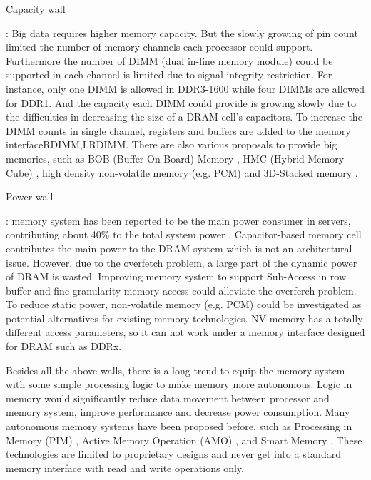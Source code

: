 \documentclass[pageno]{jpaper}
\begin{document}
\begin{bfseries}Capacity wall\end{bfseries}: Big data requires higher memory capacity. But the slowly growing of pin count limited the number of memory channels each processor could support. Furthermore the number of DIMM (dual in-line memory module) could be supported in each channel is limited due to signal integrity restriction. For instance, only one DIMM is allowed in DDR3-1600 while four DIMMs are allowed for DDR1\cite{DIMMLimit}. And the capacity each DIMM could provide is growing slowly due to the difficulties in decreasing the size of a DRAM cell's capacitors\cite{BOBMemory}. To increase the DIMM counts in single channel, registers and buffers are added to the memory interface{RDIMM,LRDIMM}.
There are also various proposals to provide big memories, such as BOB (Buffer On Board) Memory \cite{BOBMemory}, HMC (Hybrid Memory Cube) \cite{HMC}, high density non-volatile memory (e.g. PCM) \cite{PCMArch} and 3D-Stacked memory \cite{PacketMemory}.



\begin{bfseries}Power wall\end{bfseries}: memory system has been reported to be the main power consumer in servers, contributing about 40\% to the total system power \cite{MemoryPowerWall,MemScalePower}. Capacitor-based memory cell contributes the main power to the DRAM system which is not an architectural issue. However, due to the overfetch problem, a large part of the dynamic power of DRAM is wasted. Improving memory system to support Sub-Access in row buffer and fine granularity memory access could alleviate the overferch problem. To reduce static power, non-volatile memory (e.g. PCM) could be investigated as potential alternatives for existing memory technologies. NV-memory  has a totally different access parameters, so it can not work under a memory interface designed for DRAM such as DDRx.


Besides all the above walls, there is a long trend to equip the memory system with some simple processing logic to make memory more autonomous. Logic in memory would significantly reduce data movement between processor and memory system, improve performance and decrease power consumption. Many autonomous memory systems have been proposed before, such as Processing in Memory (PIM) \cite{PIMArch}, Active Memory Operation (AMO) \cite{AMOperations,AMController}, and Smart Memory \cite{HuaweiSmartMemory}. These technologies are limited to proprietary designs and never get into a standard memory interface with read and write operations only.
\end{document}
